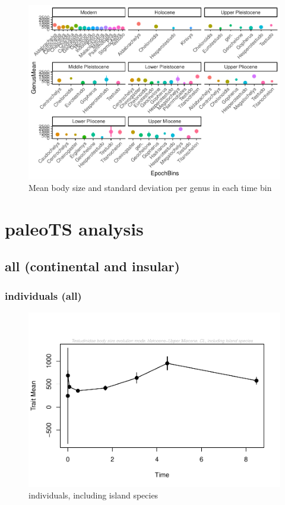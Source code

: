 \documentclass[]{article}
\begin{document}
\begin{figure}[htbp]
\centering
\includegraphics{MA_JJ_files/figure-latex/Separate genera per time bin-1.pdf}
\caption{Mean body size and standard deviation per genus in each time
bin}
\end{figure}

\newpage

\section{paleoTS analysis}\label{paleots-analysis}

\subsection{all (continental and
insular)}\label{all-continental-and-insular}

\subsubsection{individuals (all)}\label{individuals-all}

\begin{figure}[htbp]
\centering
\includegraphics{MA_JJ_files/figure-latex/paleoTS plot-1.pdf}
\caption{individuals, including island species}
\end{figure}
\end{document}
